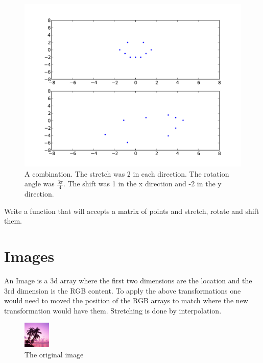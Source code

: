 \begin{figure}[H]
\includegraphics[scale = .5]{combo.pdf}
\caption{A combination. The stretch was 2 in each direction. The rotation angle was $\frac{3\pi}{4}$. The shift was 1 in the x direction and -2 in the y direction.}
\end{figure}

\begin{problem}
Write a function that will accepts a matrix of points and stretch, rotate and shift them.
\end{problem}

\section*{Images}

An Image is a 3d array where the first two dimensions are the location and the 3rd dimension is the RGB content. To apply the above transformations one would need to moved the position of the RGB arrays to match where the new transformation would have them. Stretching is done by
 interpolation.

\begin{figure}[H]
\includegraphics[scale = 2.0]{dream.png}
\caption{The original image}
\end{figure}

